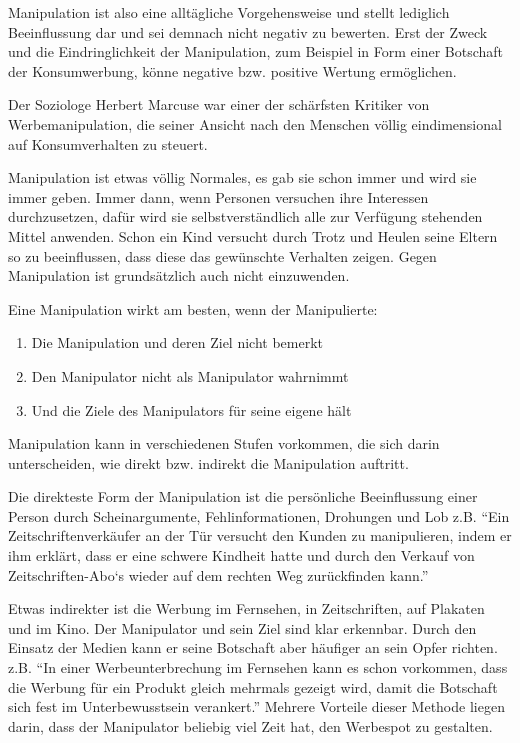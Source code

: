 Manipulation ist also eine alltägliche Vorgehensweise und stellt lediglich Beeinflussung dar und sei
demnach nicht negativ zu bewerten. Erst der Zweck und die Eindringlichkeit der Manipulation, zum
Beispiel in Form einer Botschaft der Konsumwerbung, könne negative bzw. positive Wertung ermöglichen.

Der Soziologe Herbert Marcuse war einer der schärfsten Kritiker von Werbemanipulation, die seiner
Ansicht nach den Menschen völlig eindimensional auf Konsumverhalten zu steuert.

Manipulation ist etwas völlig Normales, es gab sie schon immer und wird sie immer geben. Immer dann,
wenn Personen versuchen ihre Interessen durchzusetzen, dafür wird sie selbstverständlich alle zur
Verfügung stehenden Mittel anwenden. Schon ein Kind versucht durch Trotz und Heulen seine Eltern so
zu beeinflussen, dass diese das gewünschte Verhalten zeigen. Gegen Manipulation ist grundsätzlich
auch nicht einzuwenden.

Eine Manipulation wirkt am besten, wenn der Manipulierte:
\begin{enumerate}
	\item Die Manipulation und deren Ziel nicht bemerkt
	\item Den Manipulator nicht als Manipulator wahrnimmt
	\item Und die Ziele des Manipulators für seine eigene hält
\end{enumerate}

Manipulation kann in verschiedenen Stufen vorkommen, die sich darin unterscheiden, wie direkt bzw.
indirekt die Manipulation auftritt.

Die direkteste Form der Manipulation ist die persönliche Beeinflussung einer Person durch
Scheinargumente, Fehlinformationen, Drohungen und Lob
z.B. \enquote{Ein Zeitschriftenverkäufer an der Tür versucht den Kunden zu manipulieren, indem er ihm
erklärt, dass er eine schwere Kindheit hatte und durch den Verkauf von Zeitschriften-Abo`s wieder
auf dem rechten Weg zurückfinden kann.}

Etwas indirekter ist die Werbung im Fernsehen, in Zeitschriften, auf Plakaten und im Kino. Der
Manipulator und sein Ziel sind klar erkennbar. Durch den Einsatz der Medien kann er seine Botschaft
aber häufiger an sein Opfer richten.
z.B. \enquote{In einer Werbeunterbrechung im Fernsehen kann es schon vorkommen, dass die Werbung für
ein Produkt gleich mehrmals gezeigt wird, damit die Botschaft sich fest im Unterbewusstsein
verankert.}
Mehrere Vorteile dieser Methode liegen darin, dass der Manipulator beliebig viel Zeit hat, den
Werbespot zu gestalten.

